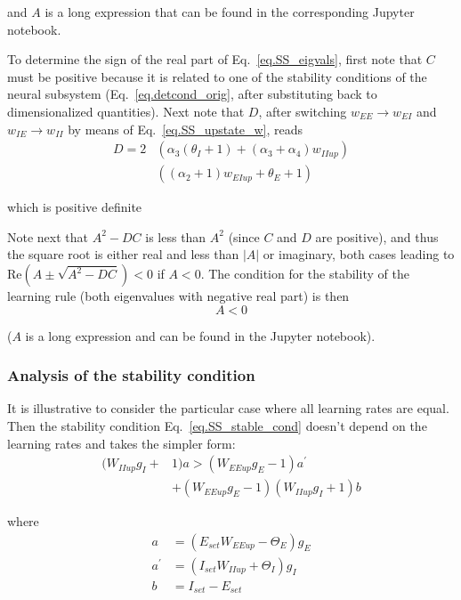 \documentclass[
twocolumn,
]{article}
\newcommand{\EE}{\mathit{EE}}
\newcommand{\EI}{\mathit{EI}}
\newcommand{\IE}{\mathit{IE}}
\newcommand{\II}{\mathit{II}}
\newcommand{\set}{\mathit{set}}
\newcommand{\up}{\mathit{up}}
\newcommand{\RE}{\mathrm{Re}}
\begin{document}
\noindent and $A$ is a long expression that can be found in the corresponding Jupyter notebook.

To determine the sign of the real part of Eq.\ \ref{eq.SS_eigvals}, first note that $C$ must be positive because it is related to one of the stability conditions of the neural subsystem (Eq.\ \ref{eq.detcond_orig}, after substituting back to dimensionalized quantities). Next note that $D$, after switching $w_{\EE} \rightarrow w_{\EI}$ and  $w_{\IE} \rightarrow w_{\II}$ by means of Eq.\ \ref{eq.SS_upstate_w}, reads
\begin{displaymath}
\begin{aligned}
D = 2 & (\alpha_3(\theta_I + 1) + (\alpha_3 + \alpha_4) w_{\II\up}) \\
& ((\alpha_2 + 1)w_{\EI\up} + \theta_E + 1)
\end{aligned}
\end{displaymath}

\noindent which is positive definite

Note next that $A^2 - DC$ is less than $A^2$ (since $C$ and $D$ are positive), and thus the square root is either real and less than $|A|$ or imaginary, both cases leading to $\RE(A \pm \sqrt{A^2-DC}) < 0$ if $A<0$. The condition for the stability of the learning rule (both eigenvalues with negative real part) is then
\begin{equation}
A < 0
\label{eq.SS_stable_cond}
\end{equation}

\noindent ($A$ is a long expression and can be found in the Jupyter notebook).


\subsubsection{Analysis of the stability condition}

It is illustrative to consider the particular case where all learning rates are equal. Then the stability condition Eq.\ \ref{eq.SS_stable_cond} doesn't depend on the learning rates and takes the simpler form:
\begin{equation}
\begin{aligned}
(W_{\II\up} g_I + & 1)a > (W_{\EE\up} g_E - 1)a^\prime \\
& + (W_{\EE\up} g_E - 1)(W_{\II\up} g_I + 1)b
\end{aligned}
\end{equation}

\noindent where
\begin{displaymath}
\begin{aligned}
a & = (E_{\set} W_{\EE\up} - \Theta_E)g_E \\
a^\prime & = (I_{\set} W_{\II\up} + \Theta_I)g_I \\
b & = I_{\set} - E_{\set}
\end{aligned}
\end{displaymath}
\end{document}
